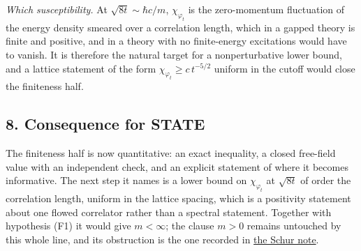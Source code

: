 \documentclass[11pt,a4paper]{article}
\begin{document}
\emph{Which susceptibility.} At \(\sqrt{8t}\sim\hbar c/m\),
\(\chi_{\varphi_t}\) is the zero-momentum fluctuation of the energy
density smeared over a correlation length, which in a gapped theory is
finite and positive, and in a theory with no finite-energy excitations
would have to vanish. It is therefore the natural target for a
nonperturbative lower bound, and a lattice statement of the form
\(\chi_{\varphi_t}\ge c\,t^{-5/2}\) uniform in the cutoff would close
the finiteness half.

\hypertarget{consequence-for-state}{%
\subsection{8. Consequence for STATE}\label{consequence-for-state}}

The finiteness half is now quantitative: an exact inequality, a closed
free-field value with an independent check, and an explicit statement of
where it becomes informative. The next step it names is a lower bound on
\(\chi_{\varphi_t}\) at \(\sqrt{8t}\) of order the correlation length,
uniform in the lattice spacing, which is a positivity statement about
one flowed correlator rather than a spectral statement. Together with
hypothesis (F1) it would give \(m<\infty\); the clause \(m>0\) remains
untouched by this whole line, and its obstruction is the one recorded in
\href{schur-error-ultraviolet.md}{the Schur note}.
\end{document}

